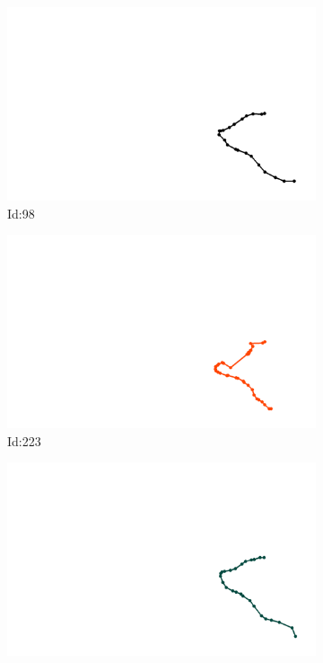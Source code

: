 \documentclass[12pt,twoside]{report}
\begin{document}
\begin{figure}
\centering
\begin{subfigure}[b]{0.20\textwidth}
\centering
\includegraphics[width=\textwidth]{../../trajectories/98.png}
\caption{Id:98}
\end{subfigure}
\begin{subfigure}[b]{0.20\textwidth}
\centering
\includegraphics[width=\textwidth]{../../trajectories/223.png}
\caption{Id:223}
\end{subfigure}
\begin{subfigure}[b]{0.20\textwidth}
\centering
\includegraphics[width=\textwidth]{../../trajectories/472.png}

\end{subfigure}
\end{figure}
\end{document}
